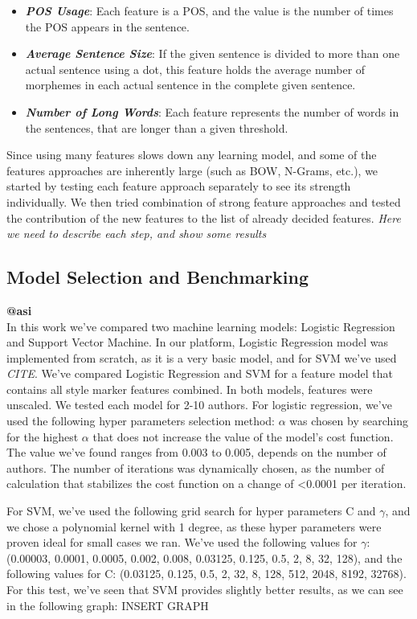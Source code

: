 \documentclass[a4paper]{article}
\begin{document}
\begin{itemize}
\item \textbf{\emph{POS Usage}}: Each feature is a POS, and the value is the number of times the POS appears in the sentence.
\item \textbf{\emph{Average Sentence Size}}: If the given sentence is divided to more than one actual sentence using a dot, this feature holds the average number of morphemes in each actual sentence in the complete given sentence.
\item \textbf{\emph{Number of Long Words}}: Each feature represents the number of words in the sentences, that are longer than a given threshold.
\end{itemize}
Since using many features slows down any learning model, and some of the features approaches are inherently large (such as BOW, N-Grams, etc.), we started by testing each feature approach separately to see its strength individually. We then tried combination of strong feature approaches and tested the contribution of the new features to the list of already decided features.
\emph{Here we need to describe each step, and show some results}

\subsection{Model Selection and Benchmarking}
\textbf{@asi}\\

In this work we've compared two machine learning models: Logistic Regression and Support Vector Machine.
In our platform, Logistic Regression model was implemented from scratch, as it is a very basic model, and for SVM we've used \emph{CITE}.
We've compared Logistic Regression and SVM for a feature model that contains all style marker features combined.
In both models, features were unscaled.
We tested each model for 2-10 authors.
For logistic regression, we've used the following hyper parameters selection method:
$\alpha$ was chosen by searching for the highest $\alpha$ that does not increase the value of the model's cost function. The value we've found ranges from 0.003 to 0.005, depends on the number of authors.
The number of iterations was dynamically chosen, as the number of calculation that stabilizes the cost function on a change of \textless 0.0001 per iteration.

For SVM, we've used the following grid search for hyper parameters C and $\gamma$, and we chose a polynomial kernel with 1 degree, as these hyper parameters were proven ideal for small cases we ran.
We've used the following values for $\gamma$: (0.00003, 0.0001, 0.0005, 0.002, 0.008, 0.03125, 0.125, 0.5, 2, 8, 32, 128), and the following values for C: (0.03125, 0.125, 0.5, 2, 32, 8, 128, 512, 2048, 8192, 32768).
For this test, we've seen that SVM provides slightly better results, as we can see in the following graph:
INSERT GRAPH
\end{document}
